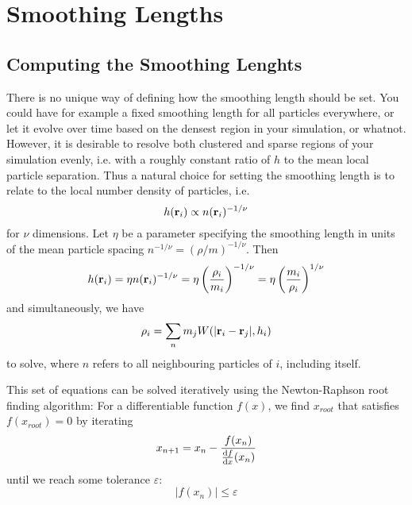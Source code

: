 \newpage
\section{Smoothing Lengths}\label{chap:smoothing_length}


\subsection{Computing the Smoothing Lenghts}



There is no unique way of defining how the smoothing length should be set.
You could have for example a fixed smoothing length for all particles everywhere, or let it evolve over time based on the densest region in your simulation, or whatnot.
However, it is desirable to resolve both clustered and sparse regions of your simulation evenly, i.e. with a roughly constant ratio of $h$ to the mean local particle separation.
Thus a natural choice for setting the smoothing length is to relate to the local number density of particles, i.e.
\begin{equation}
	h(\mathbf{r}_i) \propto n(\mathbf{r}_i) ^ {-1/\nu}
\end{equation}
for $\nu$ dimensions.
Let $\eta$ be a parameter specifying the smoothing length in units of the mean particle spacing $n ^ {-1/\nu} = (\rho/m) ^ {-1/\nu}$.
Then
\begin{equation}
	h(\mathbf{r}_i) = \eta n(\mathbf{r}_i) ^ {-1/\nu} = \eta \left(\frac{\rho_i}{m_i}\right) ^ {-1/\nu} = \eta \left(\frac{m_i}{\rho_i}\right) ^ {1/\nu}
\end{equation}
and simultaneously, we have
\begin{equation}
	\rho_i = \sum_{n} m_j W(|\R_i - \R_j|, h_i)
\end{equation}
to solve, where $n$ refers to all neighbouring particles of $i$, including itself.

This set of equations can be solved iteratively using the Newton-Raphson root finding algorithm:
For a differentiable function $f(x)$, we find $x_{root}$ that satisfies $f(x_{root}) = 0$ by iterating
\begin{equation}
	x_{n+1} = x_{n} - \frac{f(x_n)}{\frac{\mathrm{d} f}{\mathrm{d} x}(x_n)}
\end{equation}
until we reach some tolerance $\varepsilon$:
\begin{equation}
	|f(x_n)| \leq \varepsilon
\end{equation}


